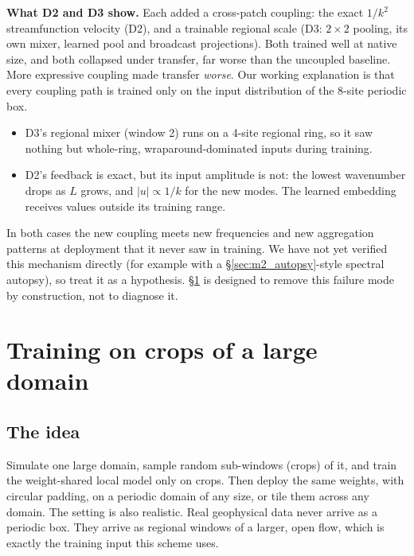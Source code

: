 \documentclass[11pt]{article}
\begin{document}
\textbf{What D2 and D3 show.} Each added a cross-patch coupling: the exact
$1/k^2$ streamfunction velocity (D2), and a trainable regional scale (D3:
$2\times2$ pooling, its own mixer, learned pool and broadcast projections).
Both trained well at native size, and both collapsed under transfer, far
worse than the uncoupled baseline. More expressive coupling made transfer
\emph{worse}. Our working explanation is that every coupling path is
trained only on the input distribution of the 8-site periodic box.
\begin{itemize}[leftmargin=*]
\item D3's regional mixer (window 2) runs on a 4-site regional ring, so it
  saw nothing but whole-ring, wraparound-dominated inputs during training.
\item D2's feedback is exact, but its input amplitude is not: the lowest
  wavenumber drops as $L$ grows, and $|u|\propto 1/k$ for the new modes.
  The learned embedding receives values outside its training range.
\end{itemize}
In both cases the new coupling meets new frequencies and new aggregation
patterns at deployment that it never saw in training. We have not yet
verified this mechanism directly (for example with a
\S\ref{sec:m2_autopsy}-style spectral autopsy), so treat it as a hypothesis.
\S\ref{sec:crop_training} is designed to remove this failure mode by
construction, not to diagnose it.

\section{Training on crops of a large domain}
\label{sec:crop_training}

\subsection{The idea}

Simulate one large domain, sample random sub-windows (crops) of it, and
train the weight-shared local model only on crops. Then deploy the same
weights, with circular padding, on a periodic domain of any size, or tile
them across any domain. The setting is also realistic. Real geophysical
data never arrive as a periodic box. They arrive as regional windows of a
larger, open flow, which is exactly the training input this scheme uses.
\end{document}
